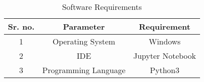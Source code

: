 \begin{center}
\begin{table}[!htb]
		\begin{tabular}{| c | c | c |}
		\hline
		\textbf{Sr. no.} & \textbf{Parameter} & \textbf{Requirement} \\
		\hline
		1 & Operating System & Windows \\
		\hline
		2 &  IDE & Jupyter Notebook \\
		\hline
		3 & Programming Language & Python3 \\
		\hline
		\end{tabular}
		\caption{Software Requirements}

\end{table}
\end{center}
